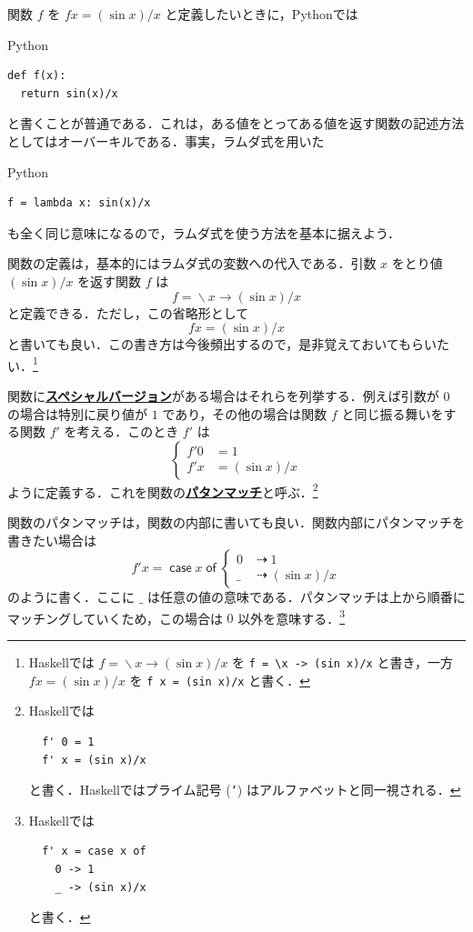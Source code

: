\documentclass[a4paper,twocolumn]{jsbook}
\newcommand{\programminglanguage}[1]{\textsf{#1}}
\newcommand{\haskell}{\programminglanguage{Haskell}}
\newcommand{\python}{\programminglanguage{Python}}
\newcommand{\keyword}[1]{{\underline{\textbf{#1}}}}
\newcommand{\code}[1]{\texttt{#1}}
\newenvironment{pythoncode}{\begin{itembox}[r]{\python}}{\end{itembox}}
\newcommand{\mKeyword}[1]{\mathsf{#1}} %
\newcommand{\mCaseKeyword}{\mKeyword{case}}
\newcommand{\mOfKeyword}{\mKeyword{of}}
\DeclareMathOperator{\mCase}{\mCaseKeyword} %
\DeclareMathOperator{\mOf}{\mOfKeyword} %
\newcommand{\mAnyParam}{\_}
\DeclareMathOperator{\mIfSo}{\dashrightarrow}
\DeclareMathOperator{\mLambda}{\backslash}
\DeclareMathOperator{\mLambdaArrow}{\rightarrow}
\newcommand{\mCaseOf}[1]{\mCase{#1}\mOf}
\newcommand{\mLambdaExp}[2]{\mLambda{#1}\mLambdaArrow{#2}}
\begin{document}
関数 $f$ を $fx=(\sin x)/x$ と定義したいときに，\python では
\begin{pythoncode}
\begin{verbatim}
def f(x):
  return sin(x)/x
\end{verbatim}
\end{pythoncode}
と書くことが普通である．これは，ある値をとってある値を返す関数の記述方法としてはオーバーキルである．事実，ラムダ式を用いた
\begin{pythoncode}
\begin{verbatim}
f = lambda x: sin(x)/x
\end{verbatim}
\end{pythoncode}
も全く同じ意味になるので，ラムダ式を使う方法を基本に据えよう．

関数の定義は，基本的にはラムダ式の変数への代入である．引数 $x$ をとり値 $(\sin x)/x$ を返す関数 $f$ は
\begin{equation}
f=\mLambdaExp{x}{(\sin x)/x}
\end{equation}
と定義できる．ただし，この省略形として
\begin{equation}
fx=(\sin x)/x
\end{equation}
と書いても良い．この書き方は今後頻出するので，是非覚えておいてもらいたい．\footnote{\haskell では $f=\mLambdaExp{x}{(\sin x)/x}$ を \code{f = \textbackslash x -> (sin x)/x} と書き，一方 $fx=(\sin x)/x$ を \code{f x = (sin x)/x} と書く．}

関数に\keyword{スペシャルバージョン}がある場合はそれらを列挙する．例えば引数が $0$ の場合は特別に戻り値が $1$ であり，その他の場合は関数 $f$ と同じ振る舞いをする関数 $f'$ を考える．このとき $f'$ は
\begin{equation}
\left\{
\begin{split}
f'0&=1\\
f'x&=(\sin x)/x
\end{split}
\right.
\end{equation}
ように定義する．これを関数の\keyword{パタンマッチ}と呼ぶ．\footnote{\haskell では
\begin{verbatim}
  f' 0 = 1
  f' x = (sin x)/x
\end{verbatim}
と書く．\haskell ではプライム記号 (\code{'}) はアルファベットと同一視される．}

関数のパタンマッチは，関数の内部に書いても良い．関数内部にパタンマッチを書きたい場合は
\begin{equation}
f'x=\mCaseOf{x}\left\{
\begin{split}
0&\mIfSo1\\
\mAnyParam&\mIfSo(\sin x)/x
\end{split}
\right.
\end{equation}
のように書く．ここに $\mAnyParam$ は任意の値の意味である．パタンマッチは上から順番にマッチングしていくため，この場合は $0$ 以外を意味する．\footnote{\haskell では
\begin{verbatim}
  f' x = case x of
    0 -> 1
    _ -> (sin x)/x
\end{verbatim}
と書く．}
\end{document}
